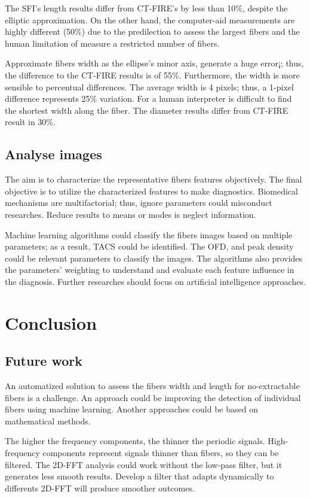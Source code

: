 \documentclass[12pt,a4paper]{article}
\begin{document}
The SFI's length results differ from CT-FIRE's by less than 10\%, despite the elliptic approximation. On the other hand, the computer-aid measurements are highly different (50\%) due to the predilection to assess the largest fibers and the human limitation of measure a restricted number of fibers.
 
Approximate fibers width as the ellipse's minor axis, generate a huge error¡; thus, the difference to the CT-FIRE results is of 55\%. Furthermore, the width is more sensible to percentual differences. The average width is 4 pixels; thus, a 1-pixel difference represents 25\% variation. For a human interpreter is difficult to find the shortest width along the fiber.  The diameter results differ from CT-FIRE result in 30\%. 

\subsection{Analyse images}
The aim is to characterize the representative fibers features objectively. The final objective is to utilize the characterized features to make diagnostics.  Biomedical mechanisms are multifactorial; thus, ignore parameters could misconduct researches. Reduce results to means or modes is neglect information.

Machine learning algorithms could classify the fibers images based on multiple parameters; as a result, TACS could be identified. The OFD, and peak density could be relevant parameters to classify the images. The algorithms also provides the parameters' weighting to understand and evaluate each feature influence in the diagnosis. Further researches should focus on artificial intelligence approaches. 

\section{Conclusion}
\subsection{Future work}
An automatized solution to assess the fibers width and length for no-extractable fibers is a challenge. An approach could be improving the detection of individual fibers using machine learning. Another approaches could be based on mathematical methods. 

The higher the frequency components, the thinner the periodic signals. High-frequency components represent signals thinner than fibers, so they can be filtered. The 2D-FFT analysis could work without the low-pass filter, but it generates less smooth results.   Develop a filter that adapts dynamically to differents 2D-FFT will produce smoother outcomes.
\end{document}
